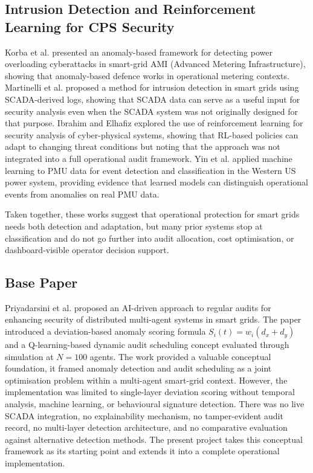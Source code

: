 \subsection{Intrusion Detection and Reinforcement Learning for CPS Security}

Korba et al. \cite{korba2020anomaly} presented an anomaly-based framework for detecting power overloading cyberattacks in smart-grid AMI (Advanced Metering Infrastructure), showing that anomaly-based defence works in operational metering contexts. Martinelli et al. \cite{martinelli2022method} proposed a method for intrusion detection in smart grids using SCADA-derived logs, showing that SCADA data can serve as a useful input for security analysis even when the SCADA system was not originally designed for that purpose. Ibrahim and Elhafiz \cite{ibrahim2023security} explored the use of reinforcement learning for security analysis of cyber-physical systems, showing that RL-based policies can adapt to changing threat conditions but noting that the approach was not integrated into a full operational audit framework. Yin et al. \cite{yin2024event} applied machine learning to PMU data for event detection and classification in the Western US power system, providing evidence that learned models can distinguish operational events from anomalies on real PMU data.

Taken together, these works suggest that operational protection for smart grids needs both detection and adaptation, but many prior systems stop at classification and do not go further into audit allocation, cost optimisation, or dashboard-visible operator decision support.

\subsection{Base Paper}

Priyadarsini et al. \cite{priyadarsini2025enhancing} proposed an AI-driven approach to regular audits for enhancing security of distributed multi-agent systems in smart grids. The paper introduced a deviation-based anomaly scoring formula $S_i(t) = w_i(d_x + d_y)$ and a Q-learning-based dynamic audit scheduling concept evaluated through simulation at $N = 100$ agents. The work provided a valuable conceptual foundation, it framed anomaly detection and audit scheduling as a joint optimisation problem within a multi-agent smart-grid context. However, the implementation was limited to single-layer deviation scoring without temporal analysis, machine learning, or behavioural signature detection. There was no live SCADA integration, no explainability mechanism, no tamper-evident audit record, no multi-layer detection architecture, and no comparative evaluation against alternative detection methods. The present project takes this conceptual framework as its starting point and extends it into a complete operational implementation.

